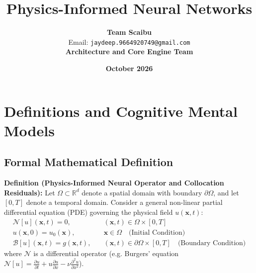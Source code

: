\documentclass[11pt,a4paper]{article}
\title{\textbf{Physics-Informed Neural Networks}}
\author{\textbf{Team Scaibu} \\ \small Email: \texttt{jaydeep.9664920749@gmail.com} \\ \small \textbf{Architecture and Core Engine Team}}
\date{\textbf{October 2026}}
\theoremstyle{definition}
\begin{document}
\maketitle

\section{Definitions and Cognitive Mental Models}

\subsection{Formal Mathematical Definition}
\textbf{Definition (Physics-Informed Neural Operator and Collocation Residuals):}
Let $\Omega \subset \mathbb{R}^d$ denote a spatial domain with boundary $\partial \Omega$, and let $[0, T]$ denote a temporal domain. Consider a general non-linear partial differential equation (PDE) governing the physical field $u(\mathbf{x}, t)$:
{\boldmath
\begin{align}
\mathcal{N}[u](\mathbf{x}, t) = 0, \quad &(\mathbf{x}, t) \in \Omega \times [0, T] \\
u(\mathbf{x}, 0) = u_0(\mathbf{x}), \quad &\mathbf{x} \in \Omega \quad \text{(Initial Condition)} \\
\mathcal{B}[u](\mathbf{x}, t) = g(\mathbf{x}, t), \quad &(\mathbf{x}, t) \in \partial \Omega \times [0, T] \quad \text{(Boundary Condition)}
\end{align}
}
where $\mathcal{N}$ is a differential operator (e.g. Burgers' equation $\mathcal{N}[u] = \frac{\partial u}{\partial t} + u \frac{\partial u}{\partial x} - \nu \frac{\partial^2 u}{\partial x^2}$).
\end{document}

